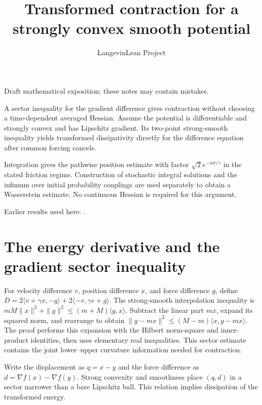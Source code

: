 \documentclass[11pt,a4paper]{article}
\title{\texorpdfstring{Transformed contraction for a strongly convex smooth potential}{Transformed contraction for a strongly convex smooth potential}}
\author{LangevinLean Project}
\date{}
\begin{document}
\maketitle
Draft mathematical exposition; these notes may contain mistakes.


A sector inequality for the gradient difference gives contraction without choosing a time-dependent averaged Hessian. Assume the potential is differentiable and strongly convex and has Lipschitz gradient. Its two-point strong-smooth inequality yields transformed dissipativity directly for the difference equation after common forcing cancels.



Integration gives the pathwise position estimate with factor \(\sqrt2e^{-mt/\gamma}\) in the stated friction regime. Construction of stochastic integral solutions and the infimum over initial probability couplings are used separately to obtain a Wasserstein estimate. No continuous Hessian is required for this argument.



Earlier results used here: \cite[Section~3.10]{LangevinLean2026ULASC}.

\section{\texorpdfstring{The energy derivative and the gradient sector inequality}{The energy derivative and the gradient sector inequality}}


For velocity difference \(v\), position difference \(x\), and force difference \(g\), define \(D=2\langle v+\gamma x,-g\rangle+2\langle-v,\gamma v+g\rangle\). The strong-smooth interpolation inequality is \(mM\|x\|^2+\|g\|^2\le(m+M)\langle g,x\rangle\). Subtract the linear part \(mx\), expand its squared norm, and rearrange to obtain \(\|g-mx\|^2\le(M-m)\langle x,g-mx\rangle\). The proof performs this expansion with the Hilbert norm-square and inner-product identities, then uses elementary real inequalities. This sector estimate contains the joint lower–upper curvature information needed for contraction.



Write the displacement as \(q=x-y\) and the force difference as \(d=\nabla f(x)-\nabla f(y)\). Strong convexity and smoothness place \((q,d)\) in a sector narrower than a bare Lipschitz ball. This relation implies dissipation of the transformed energy.
\end{document}
